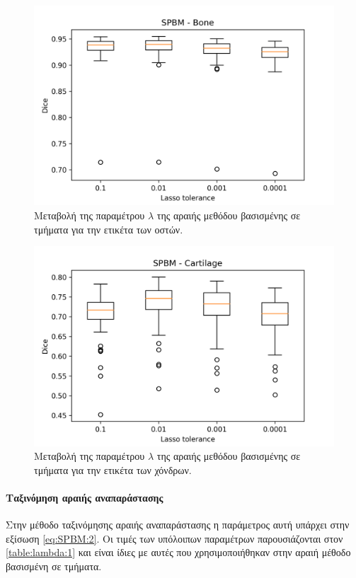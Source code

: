 \documentclass[a4paper,12pt]{article}
\newcommand{\paragraphLine}[1]{\paragraph{#1}\mbox{}}
\begin{document}
\begin{figure}[H]
    \centering
    \includegraphics[width=0.85\linewidth]{SPBM_Lasso_tolerance_Bone_plot.png}
    \caption{Μεταβολή της παραμέτρου $\lambda$ της αραιής μεθόδου βασισμένης σε
             τμήματα για την ετικέτα των οστών.}
    \label{fig:SPBM:lambda:2}
\end{figure}

\begin{figure}[H]
    \centering
    \includegraphics[width=0.85\linewidth]{SPBM_Lasso_tolerance_Cartilage_plot.png}
    \caption{Μεταβολή της παραμέτρου $\lambda$ της αραιής μεθόδου βασισμένης σε
             τμήματα για την ετικέτα των χόνδρων.}
    \label{fig:SPBM:lambda:3}
\end{figure}

\paragraphLine{Ταξινόμηση αραιής αναπαράστασης}

Στην μέθοδο ταξινόμησης αραιής αναπαράστασης η παράμετρος αυτή υπάρχει στην
εξίσωση \eqref{eq:SPBM:2}. Οι τιμές των υπόλοιπων παραμέτρων παρουσιάζονται στον
\autoref{table:lambda:1} και είναι ίδιες με αυτές που χρησιμοποιήθηκαν στην
αραιή μέθοδο βασισμένη σε τμήματα.
\end{document}
